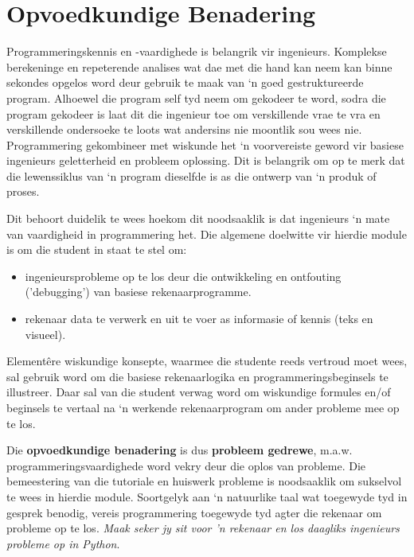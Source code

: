\section{Opvoedkundige Benadering}
    Programmeringskennis en -vaardighede is belangrik vir ingenieurs. Komplekse
    berekeninge en repeterende analises wat dae met die hand kan neem kan binne
    sekondes opgelos word deur gebruik te maak van `n goed gestruktureerde
    program.  Alhoewel die program self tyd neem om gekodeer te word, sodra die
    program gekodeer is laat dit die ingenieur toe om verskillende vrae te vra
    en verskillende ondersoeke te loots wat andersins nie moontlik sou wees
    nie.  Programmering gekombineer met wiskunde het `n voorvereiste geword vir
    basiese ingenieurs geletterheid en probleem oplossing. Dit is belangrik om
    op te merk dat die lewenssiklus van `n program dieselfde is as die ontwerp
    van `n produk of proses.

    Dit behoort duidelik te wees hoekom dit noodsaaklik is dat ingenieurs `n
    mate van vaardigheid in programmering het. Die algemene doelwitte vir
    hierdie module is om die student in staat te stel om:
        \begin{itemize}
        \item ingenieursprobleme op te los deur die ontwikkeling en ontfouting
        ('debugging') van basiese rekenaarprogramme.
        \item rekenaar data te verwerk en uit te voer as informasie of
        kennis (teks en visueel).
        \end{itemize}

    Element\^{e}re wiskundige konsepte, waarmee die studente reeds vertroud
    moet wees, sal gebruik word om die basiese rekenaarlogika en
    programmeringsbeginsels te illustreer. Daar sal van die student verwag word
    om wiskundige formules en/of beginsels te vertaal na `n werkende
    rekenaarprogram om ander probleme mee op te los.

    Die \textbf{opvoedkundige benadering} is dus \textbf{probleem gedrewe},
    m.a.w.  programmeringsvaardighede word vekry deur die oplos van probleme.
    Die bemeestering van die tutoriale en huiswerk probleme is noodsaaklik om
    sukselvol te wees in hierdie module. Soortgelyk aan `n natuurlike taal wat
    toegewyde tyd in gesprek benodig, vereis programmering toegewyde tyd agter
    die rekenaar om probleme op te los. \textit{Maak seker jy sit voor 'n
    rekenaar en los daagliks ingenieurs probleme op in Python}.

